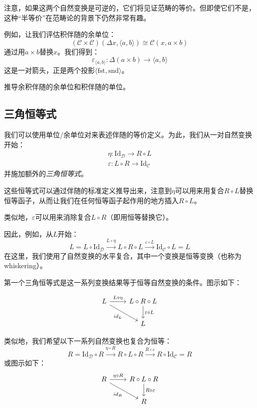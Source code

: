 \documentclass[DaoFP]{subfiles}
\begin{document}
注意，如果这两个自然变换是可逆的，它们将见证范畴的等价。但即使它们不是，这种“半等价”在范畴论的背景下仍然非常有趣。

例如，让我们评估积伴随的余单位：
\[  (\mathcal{C} \times \mathcal{C})( \Delta x,  \langle a, b \rangle ) \cong  \mathcal{C} (x, a \times b)  \]
通过用$a \times b$替换$x$。我们得到：
\[ \varepsilon_{\langle a, b \rangle} \colon \Delta (a \times b) \to \langle a, b \rangle \]
这是一对箭头，正是两个投影$\langle \text{fst}, \text{snd} \rangle$。

\begin{exercise}
推导余积伴随的余单位和积伴随的单位。
\end{exercise}

\subsection{三角恒等式}

我们可以使用单位/余单位对来表述伴随的等价定义。为此，我们从一对自然变换开始：
\begin{align*}
\eta \colon \text{Id}_{\mathcal{D}} \to R \circ L \\
\varepsilon \colon L \circ R \to \text{Id}_{\mathcal{C}} 
\end{align*}
并施加额外的\emph{三角恒等式}。

这些恒等式可以通过伴随的标准定义推导出来，注意到$\eta$可以用来用复合$R \circ L$替换恒等函子，从而让我们在任何恒等函子起作用的地方插入$R \circ L$。

类似地，$\varepsilon$可以用来消除复合$L \circ R$（即用恒等替换它）。

因此，例如，从$L$开始：
\[ L = L \circ \text{Id}_{\mathcal{D}} \xrightarrow{L \circ \eta} L \circ R \circ L \xrightarrow{\varepsilon \circ L} \text{Id}_{\mathcal{C}} \circ L = L \]
在这里，我们使用了自然变换的水平复合，其中一个变换是恒等变换（也称为whiskering）。

第一个三角恒等式是这一系列变换结果等于恒等自然变换的条件。图示如下：

\[
 \begin{tikzcd}
 L
 \arrow[r, "L \circ \eta"]
 \arrow[rd, "id_L"']
 & L \circ R \circ L
 \arrow[d, "\varepsilon \circ L"]
 \\
 & L
  \end{tikzcd}
\]

类似地，我们希望以下一系列自然变换也复合为恒等：
\[ R = \text{Id}_{\mathcal{D}} \circ R \xrightarrow{\eta \circ R} R \circ L \circ R \xrightarrow{R \circ \varepsilon} R \circ \text{Id}_{\mathcal{C}} = R \]
或图示如下：
\[
 \begin{tikzcd}
 R
 \arrow[r, "\eta \circ R"]
 \arrow[rd, "id_R"']
 & R \circ L \circ R
 \arrow[d, "R \circ \varepsilon"]
 \\
 & R
  \end{tikzcd}
\]
\end{document}

